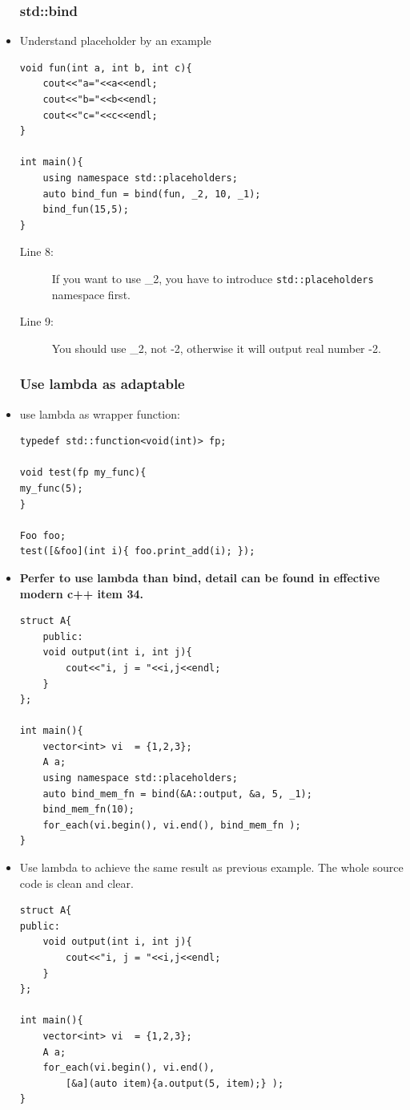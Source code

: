 \documentclass[a4paper,11pt,twoside]{book}
\begin{document}
\begin{itemize}
\subsubsection{std::bind}

	\item Understand placeholder by an example
\begin{lstlisting}
void fun(int a, int b, int c){
	cout<<"a="<<a<<endl;
	cout<<"b="<<b<<endl;
	cout<<"c="<<c<<endl;
}

int main(){
	using namespace std::placeholders;
	auto bind_fun = bind(fun, _2, 10, _1);
	bind_fun(15,5);
}
\end{lstlisting}
\begin{description}
	\item[Line 8:] If you want to use \_2, you have to introduce \texttt{std::placeholders} namespace first.
	\item[Line 9:] You should use \_2, not -2, otherwise it will output real number -2.
\end{description}
	

\subsubsection{Use lambda as adaptable}
	\item use lambda as wrapper function:
\begin{lstlisting}[numbers=none]
typedef std::function<void(int)> fp;

void test(fp my_func){
my_func(5);
}

Foo foo;
test([&foo](int i){ foo.print_add(i); });
\end{lstlisting}
	
	\item \textbf{Perfer to use lambda than bind, detail can be found in effective modern c++ item 34.}

\begin{lstlisting}
struct A{
	public:
	void output(int i, int j){
		cout<<"i, j = "<<i,j<<endl;
	}
};

int main(){
	vector<int> vi  = {1,2,3};
	A a;
	using namespace std::placeholders;
	auto bind_mem_fn = bind(&A::output, &a, 5, _1);
	bind_mem_fn(10);
	for_each(vi.begin(), vi.end(), bind_mem_fn );
}
\end{lstlisting}

	\item Use lambda to achieve the same result as previous example. The whole source code is clean and clear. 
\begin{lstlisting}
struct A{
public:
	void output(int i, int j){
		cout<<"i, j = "<<i,j<<endl;
	}
};

int main(){
	vector<int> vi  = {1,2,3};
	A a;
	for_each(vi.begin(), vi.end(), 
		[&a](auto item){a.output(5, item);} );
}
\end{lstlisting}

\end{itemize}
\end{document}
